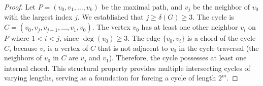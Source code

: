 \documentclass[11pt,a4paper]{article}
\begin{document}
\begin{proof}
Let $P = (v_0, v_1, \dots, v_k)$ be the maximal path, and $v_j$ be the neighbor of $v_0$ with the largest index $j$. We established that $j \ge \delta(G) \ge 3$. The cycle is $C = (v_0, v_j, v_{j-1}, \dots, v_1, v_0)$.
The vertex $v_0$ has at least one other neighbor $v_i$ on $P$ where $1 < i < j$, since $\deg(v_0) \ge 3$. The edge $\{v_0, v_i\}$ is a chord of the cycle $C$, because $v_i$ is a vertex of $C$ that is not adjacent to $v_0$ in the cycle traversal (the neighbors of $v_0$ in $C$ are $v_j$ and $v_1$). Therefore, the cycle possesses at least one internal chord. This structural property provides multiple intersecting cycles of varying lengths, serving as a foundation for forcing a cycle of length $2^m$.
\end{proof}
\end{document}
